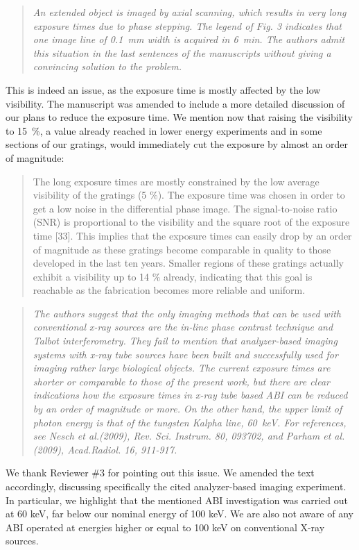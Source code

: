 \documentclass[a4paper,english]{scrartcl}
\newenvironment{reviewerquote}{\begin{quote}\itshape}{\end{quote}}
\begin{document}
\begin{reviewerquote}
    An extended object is imaged by axial scanning, which results in very
    long exposure times due to phase stepping.  The legend of Fig. 3
    indicates that one image line of \SI{0.1}{\milli\metre} width is
    acquired in \SI{6}{\minute}.  The authors admit this situation in the last sentences of the manuscripts without giving a convincing solution to the problem.
\end{reviewerquote}
This is indeed an issue, as the exposure time is mostly affected by the low visibility. The manuscript
was amended to include a more detailed discussion of our plans to reduce
the exposure time. We mention now that raising the visibility to
\SI{15}{\percent}, a value already reached in lower energy experiments and
in some sections of our gratings,
would immediately cut the exposure by almost an order of magnitude:
\begin{quote}
The long exposure times are mostly constrained by the low average
visibility of the gratings (5 \%). The exposure time was chosen in order to get a low noise in
the differential phase image. The signal-to-noise ratio (SNR) is proportional to the visibility
and the square root of the exposure time [33]. This implies that the exposure times can
easily drop by an order of magnitude as these gratings become comparable in quality to
those developed in the last ten years. Smaller regions of these gratings actually exhibit a
visibility up to 14 \% already, indicating that this goal is reachable as the fabrication becomes
more reliable and uniform.
\end{quote}
\begin{reviewerquote}
    The authors suggest that the only imaging methods that can be used with
    conventional x-ray sources are the in-line phase contrast technique and
    Talbot interferometry. They fail to mention that analyzer-based imaging
    systems with x-ray tube sources have been built and successfully used
    for imaging rather large biological objects. The current exposure times
    are shorter or comparable to those of the present work, but there are
    clear indications how the exposure times in x-ray tube based ABI can be
    reduced by an order of magnitude or more. On the other hand, the upper
    limit of photon energy is that of the tungsten Kalpha line,
    \SI{60}{\kilo\eV}. For references, see Nesch et al.(2009), Rev. Sci.
    Instrum. 80, 093702, and Parham et al.(2009), Acad.Radiol. 16, 911-917.
\end{reviewerquote}
We thank Reviewer \#3 for pointing out this issue. We amended the text
accordingly, discussing specifically the cited analyzer-based imaging experiment. In particular,
we highlight that the mentioned ABI investigation was carried out at 60 keV,
far below our nominal energy of 100 keV. We are also not aware of any ABI
operated at energies higher or equal to 100 keV on conventional X-ray sources. 
\end{document}
